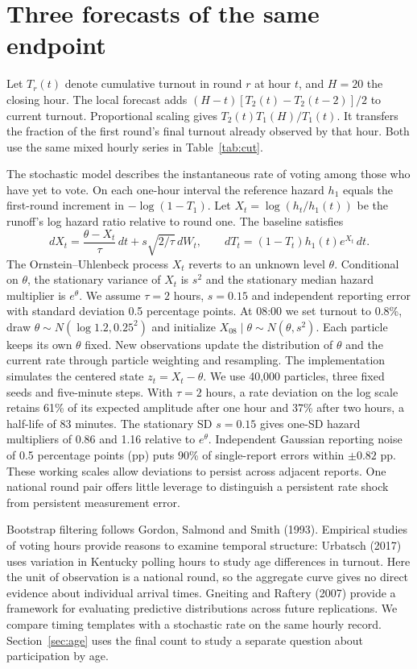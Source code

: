 \documentclass[11pt,a4paper]{article}
\begin{document}
\section{Three forecasts of the same endpoint}
Let $T_r(t)$ denote cumulative turnout in round $r$ at hour $t$, and $H=20$ the closing hour. The local forecast adds $(H-t)[T_2(t)-T_2(t-2)]/2$ to current turnout. Proportional scaling gives $T_2(t)T_1(H)/T_1(t)$. It transfers the fraction of the first round's final turnout already observed by that hour. Both use the same mixed hourly series in Table~\ref{tab:cut}.
\par The stochastic model describes the instantaneous rate of voting among those who have yet to vote. On each one-hour interval the reference hazard $h_1$ equals the first-round increment in $-\log(1-T_1)$. Let $X_t=\log(h_t/h_1(t))$ be the runoff's log hazard ratio relative to round one. The baseline satisfies
\[
 dX_t=\frac{\theta-X_t}{\tau}\,dt+s\sqrt{2/\tau}\,dW_t,
 \qquad dT_t=(1-T_t)h_1(t)e^{X_t}\,dt .
\]
The Ornstein--Uhlenbeck process $X_t$ reverts to an unknown level $\theta$. Conditional on $\theta$, the stationary variance of $X_t$ is $s^2$ and the stationary median hazard multiplier is $e^\theta$. We assume $\tau=2$ hours, $s=0.15$ and independent reporting error with standard deviation 0.5 percentage points. At 08:00 we set turnout to 0.8\%, draw $\theta\sim N(\log 1.2,0.25^2)$ and initialize $X_{08}\mid\theta\sim N(\theta,s^2)$. Each particle keeps its own $\theta$ fixed. New observations update the distribution of $\theta$ and the current rate through particle weighting and resampling. The implementation simulates the centered state $z_t=X_t-\theta$. We use 40,000 particles, three fixed seeds and five-minute steps. With $\tau=2$ hours, a rate deviation on the log scale retains 61\% of its expected amplitude after one hour and 37\% after two hours, a half-life of 83 minutes. The stationary SD $s=0.15$ gives one-SD hazard multipliers of 0.86 and 1.16 relative to $e^\theta$. Independent Gaussian reporting noise of 0.5 percentage points (pp) puts 90\% of single-report errors within $\pm0.82$ pp. These working scales allow deviations to persist across adjacent reports. One national round pair offers little leverage to distinguish a persistent rate shock from persistent measurement error.
\par Bootstrap filtering follows Gordon, Salmond and Smith (1993). Empirical studies of voting hours provide reasons to examine temporal structure: Urbatsch (2017) uses variation in Kentucky polling hours to study age differences in turnout. Here the unit of observation is a national round, so the aggregate curve gives no direct evidence about individual arrival times. Gneiting and Raftery (2007) provide a framework for evaluating predictive distributions across future replications. We compare timing templates with a stochastic rate on the same hourly record. Section~\ref{sec:age} uses the final count to study a separate question about participation by age.
\end{document}
